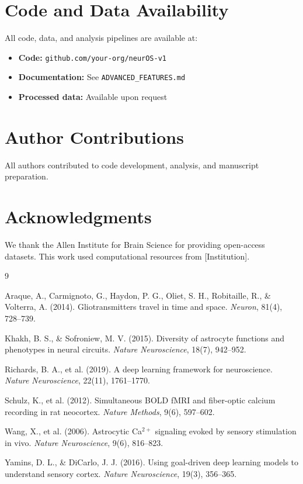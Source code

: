 \documentclass[11pt,twocolumn]{article}
\begin{document}
\section*{Code and Data Availability}

All code, data, and analysis pipelines are available at:
\begin{itemize}
    \item \textbf{Code:} \texttt{github.com/your-org/neurOS-v1}
    \item \textbf{Documentation:} See \texttt{ADVANCED\_FEATURES.md}
    \item \textbf{Processed data:} Available upon request
\end{itemize}

\section*{Author Contributions}

All authors contributed to code development, analysis, and manuscript preparation.

\section*{Acknowledgments}

We thank the Allen Institute for Brain Science for providing open-access datasets. This work used computational resources from [Institution].

\begin{thebibliography}{9}

Araque, A., Carmignoto, G., Haydon, P. G., Oliet, S. H., Robitaille, R., \& Volterra, A. (2014).
Gliotransmitters travel in time and space.
\textit{Neuron}, 81(4), 728--739.

Khakh, B. S., \& Sofroniew, M. V. (2015).
Diversity of astrocyte functions and phenotypes in neural circuits.
\textit{Nature Neuroscience}, 18(7), 942--952.

Richards, B. A., et al. (2019).
A deep learning framework for neuroscience.
\textit{Nature Neuroscience}, 22(11), 1761--1770.

Schulz, K., et al. (2012).
Simultaneous BOLD fMRI and fiber-optic calcium recording in rat neocortex.
\textit{Nature Methods}, 9(6), 597--602.

Wang, X., et al. (2006).
Astrocytic Ca$^{2+}$ signaling evoked by sensory stimulation in vivo.
\textit{Nature Neuroscience}, 9(6), 816--823.

Yamins, D. L., \& DiCarlo, J. J. (2016).
Using goal-driven deep learning models to understand sensory cortex.
\textit{Nature Neuroscience}, 19(3), 356--365.

\end{thebibliography}
\end{document}
